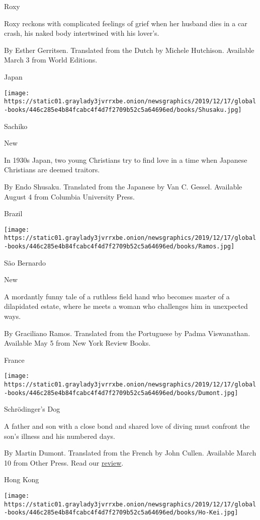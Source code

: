 Roxy

Roxy reckons with complicated feelings of grief when her husband dies in
a car crash, his naked body intertwined with his lover's.

 By Esther Gerritsen. Translated from the Dutch by Michele Hutchison.
Available March 3 from World Editions.

Japan

\texttt{[image: https://static01.graylady3jvrrxbe.onion/newsgraphics/2019/12/17/global-books/446c285e4b84fcabc4f4d7f2709b52c5a64696ed/books/Shusaku.jpg]}

Sachiko

New

In 1930s Japan, two young Christians try to find love in a time when
Japanese Christians are deemed traitors.

 By Endo Shusaku. Translated from the Japanese by Van C. Gessel.
Available August 4 from Columbia University Press.

Brazil

\texttt{[image: https://static01.graylady3jvrrxbe.onion/newsgraphics/2019/12/17/global-books/446c285e4b84fcabc4f4d7f2709b52c5a64696ed/books/Ramos.jpg]}

São Bernardo

New

A mordantly funny tale of a ruthless field hand who becomes master of a
dilapidated estate, where he meets a woman who challenges him in
unexpected ways.

 By Graciliano Ramos. Translated from the Portuguese by Padma
Viswanathan. Available May 5 from New York Review Books.

France

\texttt{[image: https://static01.graylady3jvrrxbe.onion/newsgraphics/2019/12/17/global-books/446c285e4b84fcabc4f4d7f2709b52c5a64696ed/books/Dumont.jpg]}

Schrödinger's Dog

A father and son with a close bond and shared love of diving must
confront the son's illness and his numbered days.

 By Martin Dumont. Translated from the French by John Cullen. Available
March 10 from Other Press. Read our
\href{https://www.nytimes3xbfgragh.onion/2020/04/24/books/review/schrodingers-dog-martin-dumont-girls-story-annie-ernaux-finding-dora-maar-brigitte-benkemoun.html}{review}.

Hong Kong

\texttt{[image: https://static01.graylady3jvrrxbe.onion/newsgraphics/2019/12/17/global-books/446c285e4b84fcabc4f4d7f2709b52c5a64696ed/books/Ho-Kei.jpg]}

